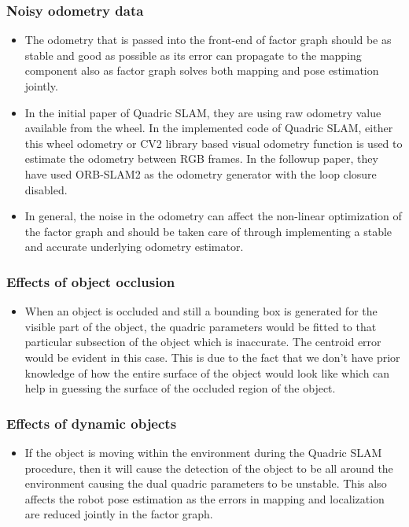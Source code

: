 \documentclass{article}
\begin{document}
\subsubsection{Noisy odometry data}
\begin{itemize}
\item The odometry that is passed into the front-end of factor graph should be as stable and good as possible as its error can propagate to the mapping component also as factor graph solves both mapping and pose estimation jointly.
\item In the initial paper of Quadric SLAM\cite{sünderhauf2017dual}, they are using raw odometry value available from the wheel. In the implemented code of Quadric SLAM, either this wheel odometry or CV2 library based visual odometry function is used to estimate the odometry between RGB frames. In the followup paper\cite{orientation_factor}, they have used ORB-SLAM2 as the odometry generator with the loop closure disabled.
\item In general, the noise in the odometry can affect the non-linear optimization of the factor graph and should be taken care of through implementing a stable and accurate underlying odometry estimator.
\end{itemize}
\subsubsection{Effects of object occlusion}
\begin{itemize}
\item When an object is occluded and still a bounding box is generated for the visible part of the object, the quadric parameters would be fitted to that particular subsection of the object which is inaccurate. The centroid error would be evident in this case. This is due to the fact that we don't have prior knowledge of how the entire surface of the object would look like which can help in guessing the surface of the occluded region of the object.
\end{itemize}

\subsubsection{Effects of dynamic objects}
\begin{itemize}
\item If the object is moving within the environment during the Quadric SLAM procedure, then it will cause the detection of the object to be all around the environment causing the dual quadric parameters to be unstable. This also affects the robot pose estimation as the errors in mapping and localization are reduced jointly in the factor graph.
\end{itemize}
\end{document}
